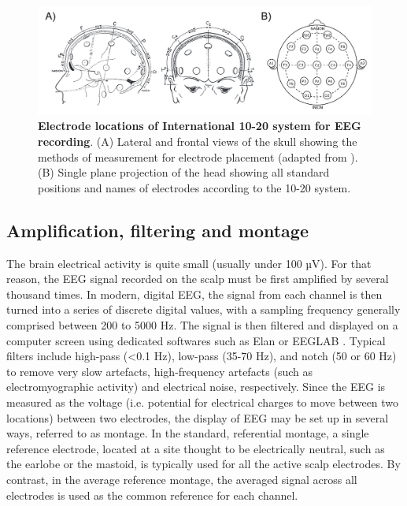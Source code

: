 \begin{figure}[htb]
	\includegraphics[width=\textwidth]{Fig/Methods/EEG_10-20/EEG_10-20.png}
	\caption[Electrode locations of International 10-20 system for EEG recording]{\textbf{Electrode locations of International 10-20 system for EEG recording}. (A) Lateral and frontal views of the skull showing the methods of measurement for electrode placement (adapted from \citealp{klem_ten-twenty_1999}). (B) Single plane projection of the head showing all standard positions and names of electrodes according to the 10-20 system. }
	\label{fig:methods:10-20}
\end{figure}

\subsection{Amplification, filtering and montage}
\label{sec:eeg:eeg:ampli}

The brain electrical activity is quite small (usually under 100 µV). For that reason, the EEG signal recorded on the scalp must be first amplified by several thousand times. In modern, digital EEG, the signal from each channel is then turned into a series of discrete digital values, with a sampling frequency generally comprised between 200 to 5000 Hz. The signal is then filtered and displayed on a computer screen using dedicated softwares such as Elan \citep{aguera_elan:_2011} or EEGLAB \citep{delorme_eeglab:_2004}. Typical filters include high-pass (<0.1 Hz), low-pass (35-70 Hz), and notch (50 or 60 Hz) to remove very slow artefacts, high-frequency artefacts (such as electromyographic activity) and electrical noise, respectively.
Since the EEG is measured as the voltage (i.e. potential for electrical charges to move between two locations) between two electrodes, the display of EEG may be set up in several ways, referred to as montage. In the standard, referential montage, a single reference electrode, located at a site thought to be electrically neutral, such as the earlobe or the mastoid, is typically used for all the active scalp electrodes. By contrast, in the average reference montage, the averaged signal across all electrodes is used as the common reference for each channel.

